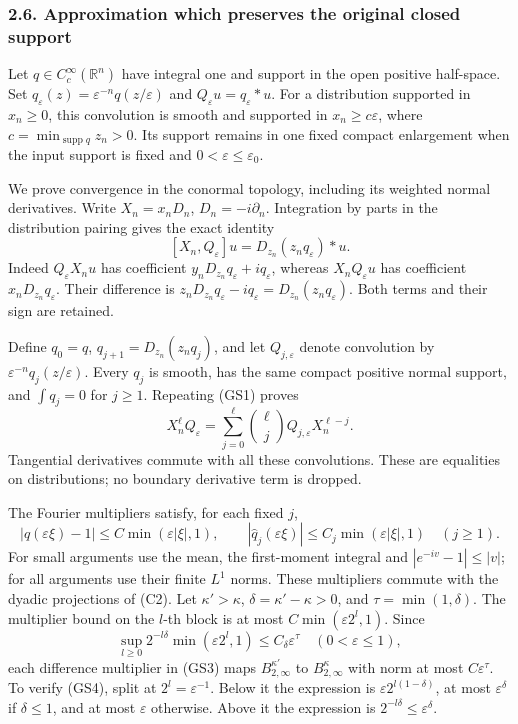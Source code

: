\documentclass[
  11pt,
]{article}
\begin{document}
\subsubsection{2.6. Approximation which preserves the original closed
support}\label{approximation-which-preserves-the-original-closed-support}

Let \(q\in C_c^\infty(\mathbb R^n)\) have integral one and support in
the open positive half-space. Set
\(q_\varepsilon(z)=\varepsilon^{-n}q(z/\varepsilon)\) and
\(Q_\varepsilon u=q_\varepsilon*u\). For a distribution supported in
\(x_n\ge0\), this convolution is smooth and supported in
\(x_n\ge c\varepsilon\), where \(c=\min_{\operatorname{supp}q}z_n>0\).
Its support remains in one fixed compact enlargement when the input
support is fixed and \(0<\varepsilon\le\varepsilon_0\).

We prove convergence in the conormal topology, including its weighted
normal derivatives. Write \(X_n=x_nD_n\), \(D_n=-i\partial_n\).
Integration by parts in the distribution pairing gives the exact
identity \[
 [X_n,Q_\varepsilon]u
     =D_{z_n}(z_nq_\varepsilon)*u.
 \tag{GS1}
\] Indeed \(Q_\varepsilon X_nu\) has coefficient
\(y_nD_{z_n}q_\varepsilon+iq_\varepsilon\), whereas
\(X_nQ_\varepsilon u\) has coefficient \(x_nD_{z_n}q_\varepsilon\).
Their difference is \(z_nD_{z_n}q_\varepsilon-iq_\varepsilon
=D_{z_n}(z_nq_\varepsilon)\). Both terms and their sign are retained.

Define \(q_0=q\), \(q_{j+1}=D_{z_n}(z_nq_j)\), and let
\(Q_{j,\varepsilon}\) denote convolution by
\(\varepsilon^{-n}q_j(z/\varepsilon)\). Every \(q_j\) is smooth, has the
same compact positive normal support, and \(\int q_j=0\) for \(j\ge1\).
Repeating (GS1) proves \[
 X_n^\ell Q_\varepsilon
       =\sum_{j=0}^{\ell}\binom\ell j
          Q_{j,\varepsilon}X_n^{\ell-j}.
 \tag{GS2}
\] Tangential derivatives commute with all these convolutions. These are
equalities on distributions; no boundary derivative term is dropped.

The Fourier multipliers satisfy, for each fixed \(j\), \[
 |\widehat q(\varepsilon\xi)-1|
       \le C\min(\varepsilon|\xi|,1),\qquad
 |\widehat q_j(\varepsilon\xi)|
       \le C_j\min(\varepsilon|\xi|,1)\quad(j\ge1).
 \tag{GS3}
\] For small arguments use the mean, the first-moment integral and
\(|e^{-iv}-1|\le|v|\); for all arguments use their finite \(L^1\) norms.
These multipliers commute with the dyadic projections of (C2). Let
\(\kappa'>\kappa\), \(\delta=\kappa'-\kappa>0\), and
\(\tau=\min(1,\delta)\). The multiplier bound on the \(l\)-th block is
at most \(C\min(\varepsilon2^l,1)\). Since \[
 \sup_{l\ge0}2^{-l\delta}\min(\varepsilon2^l,1)
       \le C_\delta\varepsilon^{\tau}\quad(0<\varepsilon\le1),
 \tag{GS4}
\] each difference multiplier in (GS3) maps \(B^{\kappa'}_{2,\infty}\)
to \(B^\kappa_{2,\infty}\) with norm at most \(C\varepsilon^\tau\). To
verify (GS4), split at \(2^l=\varepsilon^{-1}\). Below it the expression
is \(\varepsilon2^{l(1-\delta)}\), at most \(\varepsilon^\delta\) if
\(\delta\le1\), and at most \(\varepsilon\) otherwise. Above it the
expression is \(2^{-l\delta}\le\varepsilon^\delta\).
\end{document}
